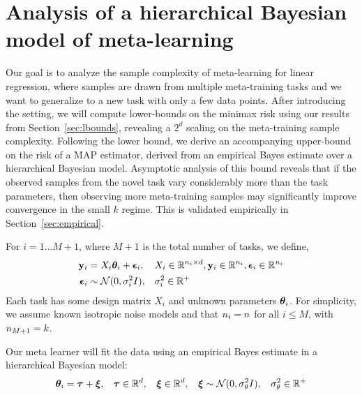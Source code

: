 
\section{Analysis of a hierarchical Bayesian model of meta-learning}
\label{sec:hierarchical_bayes}

Our goal is to analyze the sample complexity of meta-learning for linear regression, where samples are drawn from multiple meta-training tasks and we want to generalize to a new task with only a few data points. After introducing the setting, we will compute lower-bounds on the minimax risk using our results from Section~\ref{sec:lbounds}, revealing a $2^{d}$ scaling on the meta-training sample complexity. Following the lower bound, we derive an accompanying upper-bound on the risk of a MAP estimator, derived from an empirical Bayes estimate over a hierarchical Bayesian model. Asymptotic analysis of this bound reveals that if the observed samples from the novel task vary considerably more than the task parameters, then observing more meta-training samples may significantly improve convergence in the small $k$ regime. This is validated empirically in Section~\ref{sec:empirical}.

For $i = 1...M+1$, where $M+1$ is the total number of tasks, we define,
\begin{align*}
\mathbf{y}_i      &= X_i\bm{\theta}_i + \bm{\epsilon}_i, &&  X_i \in \mathbb{R}^{n_i \times d}, \mathbf{y}_i \in \mathbb{R}^{n_i}, \bm{\epsilon}_i \in \mathbb{R}^{n_i} \\
\bm{\epsilon}_i &\sim \mathcal{N}(0, \sigma^2_i I), && \sigma^2_i \in \mathbb{R}^{+}
\end{align*}
Each task has some design matrix $X_i$ and unknown parameters $\bm{\theta}_i$. For simplicity, we assume known isotropic noise models and that $n_i = {n}$ for all $i\leq M$, with $n_{M+1}={k}$.

Our meta learner will fit the data using an empirical Bayes estimate in a hierarchical Bayesian model:
\begin{align*}
\bm{\theta}_i = \bm{\tau} + \bm{\xi}, \:\:\:\: \bm{\tau} \in \mathbb{R}^{d},\:\:\:\: \bm{\xi} \in \mathbb{R}^{d},
\:\:\:\: \bm{\xi} \sim \mathcal{N}(0, \sigma^2_\theta I),\:\:\:\: \sigma^2_\theta \in \mathbb{R}^{+}
\end{align*}

